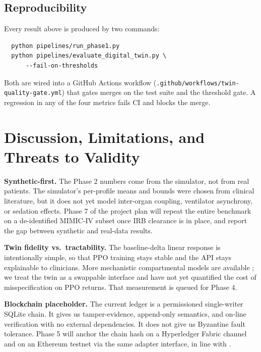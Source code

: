 \documentclass[conference]{IEEEtran}
\begin{document}
\subsection{Reproducibility}
Every result above is produced by two commands:
\begin{verbatim}
  python pipelines/run_phase1.py
  python pipelines/evaluate_digital_twin.py \
      --fail-on-thresholds
\end{verbatim}
Both are wired into a GitHub Actions workflow (\texttt{.github/workflows/twin-quality-gate.yml}) that gates merges on the test suite and the threshold gate. A regression in any of the four metrics fails CI and blocks the merge.

\section{Discussion, Limitations, and Threats to Validity}
\label{sec:discussion}

\textbf{Synthetic-first.} The Phase 2 numbers come from the simulator, not from real patients. The simulator's per-profile means and bounds were chosen from clinical literature, but it does not yet model inter-organ coupling, ventilator asynchrony, or sedation effects. Phase 7 of the project plan will repeat the entire benchmark on a de-identified MIMIC-IV \cite{johnson2023mimic} subset once IRB clearance is in place, and report the gap between synthetic and real-data results.

\textbf{Twin fidelity vs.\ tractability.} The baseline-delta linear response is intentionally simple, so that PPO training stays stable and the API stays explainable to clinicians. More mechanistic compartmental models are available \cite{weaver2024dt_vili}; we treat the twin as a swappable interface and have not yet quantified the cost of misspecification on PPO returns. That measurement is queued for Phase 4.

\textbf{Blockchain placeholder.} The current ledger is a permissioned single-writer SQLite chain. It gives us tamper-evidence, append-only semantics, and on-line verification with no external dependencies. It does not give us Byzantine fault tolerance. Phase 5 will anchor the chain hash on a Hyperledger Fabric channel and on an Ethereum testnet via the same adapter interface, in line with \cite{onwubiko2023ethereum_ipfs,access2025_bc_lstm_ppo}.
\end{document}
